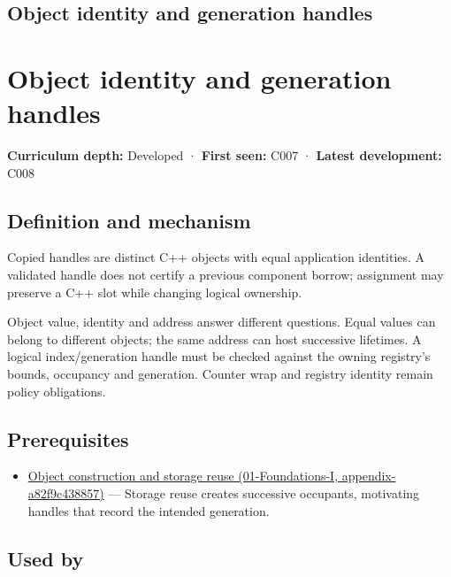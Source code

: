 \hypertarget{appendix-f1581457d322}{}
\section*{Object identity and generation handles}
\chapter{Object identity and generation handles}\label{appendix-f1581457d322-object-identity-and-generation-handles}

\textbf{Curriculum depth:} Developed · \textbf{First seen:} C007 · \textbf{Latest development:} C008

\section{Definition and mechanism}\label{appendix-f1581457d322-definition-and-mechanism}

Copied handles are distinct C++ objects with equal application identities. A validated handle does not certify a previous component borrow; assignment may preserve a C++ slot while changing logical ownership.

Object value, identity and address answer different questions. Equal values can belong to different objects; the same address can host successive lifetimes. A logical index/generation handle must be checked against the owning registry's bounds, occupancy and generation. Counter wrap and registry identity remain policy obligations.

\section{Prerequisites}\label{appendix-f1581457d322-prerequisites}

\begin{itemize}
\tightlist
\item
  \href{../01-Foundations-I/main.pdf\#nameddest=appendix-a82f9c438857}{Object construction and storage reuse (01-Foundations-I, appendix-a82f9c438857)} --- Storage reuse creates successive occupants, motivating handles that record the intended generation.
\end{itemize}

\section{Used by}\label{appendix-f1581457d322-used-by}

